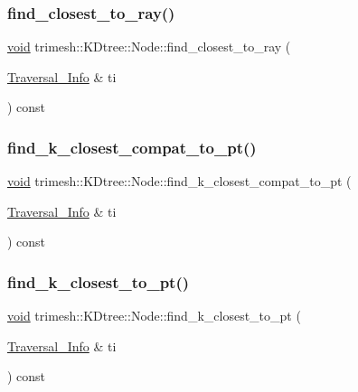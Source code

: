 \subsubsection{\texorpdfstring{find\+\_\+closest\+\_\+to\+\_\+ray()}{find\_closest\_to\_ray()}}
{\footnotesize\ttfamily \hyperlink{namespacetrimesh_a784ddfd979e1c579bda795a8edfc3f43}{void} trimesh\+::\+K\+Dtree\+::\+Node\+::find\+\_\+closest\+\_\+to\+\_\+ray (\begin{DoxyParamCaption}\item[{\hyperlink{structtrimesh_1_1KDtree_1_1Node_1_1Traversal__Info}{Traversal\+\_\+\+Info} \&}]{ti }\end{DoxyParamCaption}) const}

\mbox{\label{structtrimesh_1_1KDtree_1_1Node_a2e73ab8b410b83fcbdce3e2732046c0e}} 
\subsubsection{\texorpdfstring{find\+\_\+k\+\_\+closest\+\_\+compat\+\_\+to\+\_\+pt()}{find\_k\_closest\_compat\_to\_pt()}}
{\footnotesize\ttfamily \hyperlink{namespacetrimesh_a784ddfd979e1c579bda795a8edfc3f43}{void} trimesh\+::\+K\+Dtree\+::\+Node\+::find\+\_\+k\+\_\+closest\+\_\+compat\+\_\+to\+\_\+pt (\begin{DoxyParamCaption}\item[{\hyperlink{structtrimesh_1_1KDtree_1_1Node_1_1Traversal__Info}{Traversal\+\_\+\+Info} \&}]{ti }\end{DoxyParamCaption}) const}

\mbox{\label{structtrimesh_1_1KDtree_1_1Node_ac2932f38af02710874ff84607f3db15d}} 
\subsubsection{\texorpdfstring{find\+\_\+k\+\_\+closest\+\_\+to\+\_\+pt()}{find\_k\_closest\_to\_pt()}}
{\footnotesize\ttfamily \hyperlink{namespacetrimesh_a784ddfd979e1c579bda795a8edfc3f43}{void} trimesh\+::\+K\+Dtree\+::\+Node\+::find\+\_\+k\+\_\+closest\+\_\+to\+\_\+pt (\begin{DoxyParamCaption}\item[{\hyperlink{structtrimesh_1_1KDtree_1_1Node_1_1Traversal__Info}{Traversal\+\_\+\+Info} \&}]{ti }\end{DoxyParamCaption}) const}



